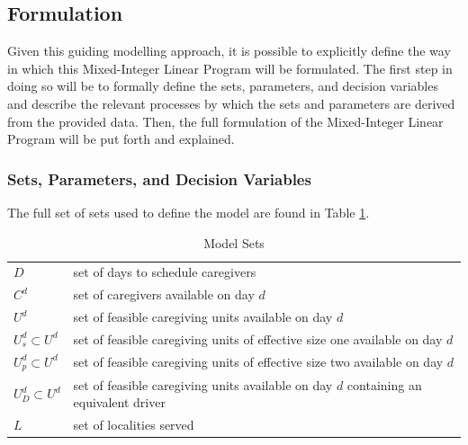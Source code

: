 \documentclass[11pt,twoside]{article}
\numberwithin{Theorem}{section}
\numberwithin{Definition}{section}
\numberwithin{Lemma}{section}
\numberwithin{Algorithm}{section}
\numberwithin{equation}{section}
\begin{document}
\subsection{Formulation}
Given this guiding modelling approach, it is possible to explicitly define the way in which this Mixed-Integer Linear Program will be formulated. The first step in doing so will be to formally define the sets, parameters, and decision variables and describe the relevant processes by which the sets and parameters are derived from the provided data. Then, the full formulation of the Mixed-Integer Linear Program will be put forth and explained.
\subsubsection{Sets, Parameters, and Decision Variables}
The full set of sets used to define the model are found in Table \ref{tab:settab}.
\begin{table}[H]
	\caption{Model Sets}
	\label{tab:settab}
	\begin{tabularx}{\textwidth}{lX}
		$D$ & set of days to schedule caregivers\\
		$C^d$ & set of caregivers available on day $d$\\
		$U^d$ & set of feasible caregiving units available on day $d$\\
		$U_s^d \subset U^d$ & set of feasible caregiving units of effective size one available on day $d$\\
		$U_p^d \subset U^d$ & set of feasible caregiving units of effective size two available on day $d$\\
		$U_D^d \subset U^d$ & set of feasible caregiving units available on day $d$ containing an equivalent driver\\
		$L$ & set of localities served
	\end{tabularx}
\end{table}
\end{document}
